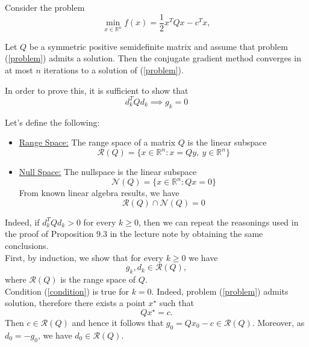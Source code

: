 \documentclass{ExerciseSheet}
\newif\ifsolutions
\begin{document}
\fi

\vskip 0.5cm
\begin{problem}
Consider the problem
\begin{equation} \label{problem}
    \min_{x \in \mathbb{R}^n} f(x) = \frac{1}{2} x^T Q x - c^T x, 
\end{equation}

Let $Q$ be a symmetric positive semidefinite matrix and assume that problem (\ref{problem}) admits a solution. Then the conjugate gradient method converges in at most $n$ iterations to a solution of (\ref{problem}).
\end{problem}

\ifsolutions
\vskip 0.3cm

\begin{solution}
In order to prove this, it is sufficient to show that \begin{equation}\label{task}
    d^T_kQd_{k} \implies g_k = 0
\end{equation}

Let's define the following:
\begin{itemize}
    \item \underline{Range Space:} The range space of a matrix $Q$ is the linear subspace 
    $$\mathcal{R}(Q) = \{x\in \mathbb{R}^n : x = Qy, \ y\in \mathbb{R}^n\}$$
    \item \underline{Null Space:} The nullspace is the linear subspace
    $$\mathcal{N}(Q) = \{x\in \mathbb{R}^n: Qx = 0\}$$
    From known linear algebra results, we have
    \begin{equation} \label{algebra}
        \mathcal{R}(Q) \cap \mathcal{N}(Q) = 0
    \end{equation}
\end{itemize}

Indeed, if $d_k^T Q d_k > 0$ for every $k \geq 0$, then we can repeat the reasonings used in the proof of Proposition $9.3$ in the lecture note by obtaining the same conclusions. \\

First, by induction, we show that for every $k \geq 0$ we have
\begin{equation} \label{condition}
g_k, d_k \in \mathcal{R}(Q), 
\end{equation}
where $\mathcal{R}(Q)$ is the range space of $Q$. \\
Condition (\ref{condition}) is true for $k = 0$. Indeed, problem (\ref{problem}) admits solution, therefore there exists a point $x^\star$ such that
\[
Q x^\star = c.
\]
Then $c \in \mathcal{R}(Q)$ and hence it follows that $g_0 = Q x_0 - c \in \mathcal{R}(Q)$. Moreover, as $d_0 = -g_0$, we have $d_0 \in \mathcal{R}(Q)$. \\


\end{solution}
\end{document}
